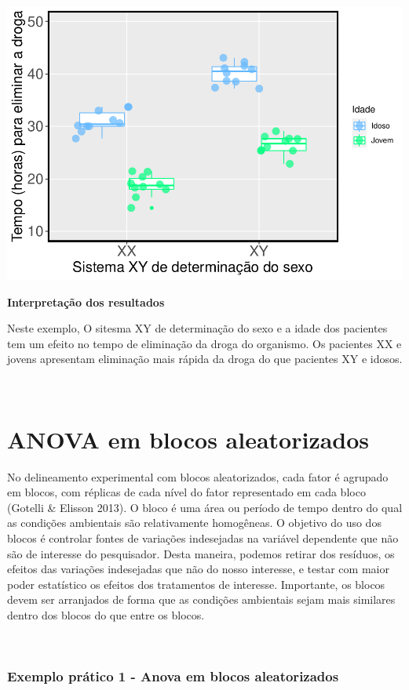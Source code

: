 \documentclass[
]{book}
\begin{document}
\includegraphics{livro_r_ecologia_files/figure-latex/unnamed-chunk-18-1.pdf}

\textbf{Interpretação dos resultados}

Neste exemplo, O sitesma XY de determinação do sexo e a idade dos pacientes tem um efeito no tempo de eliminação da droga do organismo. Os pacientes XX e jovens apresentam eliminação mais rápida da droga do que pacientes XY e idosos.

~

\hypertarget{anova-em-blocos-aleatorizados}{%
\section{ANOVA em blocos aleatorizados}\label{anova-em-blocos-aleatorizados}}

No delineamento experimental com blocos aleatorizados, cada fator é agrupado em blocos, com réplicas de cada nível do fator representado em cada bloco (Gotelli \& Elisson 2013). O bloco é uma área ou período de tempo dentro do qual as condições ambientais são relativamente homogêneas. O objetivo do uso dos blocos é controlar fontes de variações indesejadas na variável dependente que não são de interesse do pesquisador. Desta maneira, podemos retirar dos resíduos, os efeitos das variações indesejadas que não do nosso interesse, e testar com maior poder estatístico os efeitos dos tratamentos de interesse. Importante, os blocos devem ser arranjados de forma que as condições ambientais sejam mais similares dentro dos blocos do que entre os blocos.

~

\hypertarget{exemplo-pruxe1tico-1---anova-em-blocos-aleatorizados}{%
\subsubsection{Exemplo prático 1 - Anova em blocos aleatorizados}\label{exemplo-pruxe1tico-1---anova-em-blocos-aleatorizados}}
\end{document}
